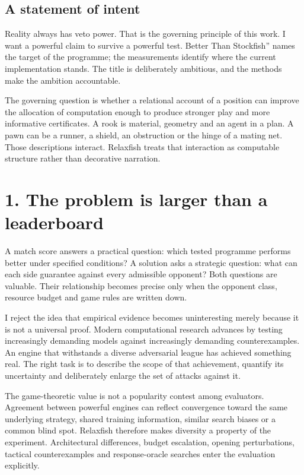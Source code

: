 \documentclass[10pt]{article}
\begin{document}
\subsection*{A statement of intent}
Reality always has veto power. That is the governing principle of this work. I want a powerful claim to survive a powerful test. Better Than Stockfish'' names the target of the programme; the measurements identify where the current implementation stands. The title is deliberately ambitious, and the methods make the ambition accountable.

The governing question is whether a relational account of a position can improve the allocation of computation enough to produce stronger play and more informative certificates. A rook is material, geometry and an agent in a plan. A pawn can be a runner, a shield, an obstruction or the hinge of a mating net. Those descriptions interact. Relaxfish treats that interaction as computable structure rather than decorative narration.

\clearpage
\section*{1. The problem is larger than a leaderboard}
A match score answers a practical question: which tested programme performs better under specified conditions? A solution asks a strategic question: what can each side guarantee against every admissible opponent? Both questions are valuable. Their relationship becomes precise only when the opponent class, resource budget and game rules are written down.

I reject the idea that empirical evidence becomes uninteresting merely because it is not a universal proof. Modern computational research advances by testing increasingly demanding models against increasingly demanding counterexamples. An engine that withstands a diverse adversarial league has achieved something real. The right task is to describe the scope of that achievement, quantify its uncertainty and deliberately enlarge the set of attacks against it.

The game-theoretic value is not a popularity contest among evaluators. Agreement between powerful engines can reflect convergence toward the same underlying strategy, shared training information, similar search biases or a common blind spot. Relaxfish therefore makes diversity a property of the experiment. Architectural differences, budget escalation, opening perturbations, tactical counterexamples and response-oracle searches enter the evaluation explicitly.
\end{document}

